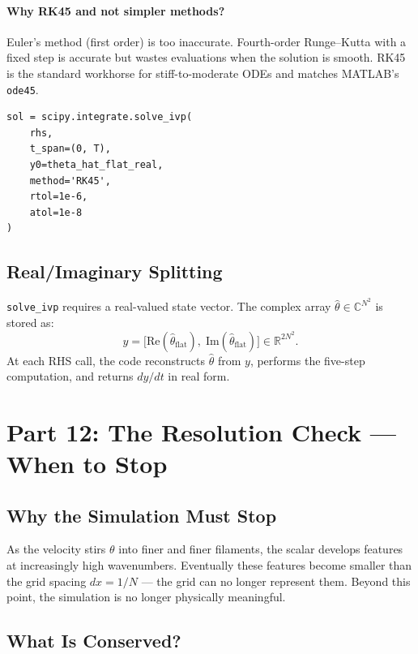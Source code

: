 \documentclass[12pt,a4paper]{article}
\newcommand{\code}[1]{\texttt{#1}}
\theoremstyle{definition}
\begin{document}
\paragraph{Why RK45 and not simpler methods?}
Euler's method (first order) is too inaccurate.  Fourth-order Runge--Kutta
with a fixed step is accurate but wastes evaluations when the solution is
smooth.  RK45 is the standard workhorse for stiff-to-moderate ODEs and matches
MATLAB's \code{ode45}.

\begin{lstlisting}
sol = scipy.integrate.solve_ivp(
    rhs,
    t_span=(0, T),
    y0=theta_hat_flat_real,
    method='RK45',
    rtol=1e-6,
    atol=1e-8
)
\end{lstlisting}

\subsection{Real/Imaginary Splitting}

\code{solve\_ivp} requires a real-valued state vector.  The complex array
$\hat\theta\in\mathbb{C}^{N^2}$ is stored as:
\[
  y = \bigl[\mathrm{Re}(\hat\theta_{\mathrm{flat}}),\;
            \mathrm{Im}(\hat\theta_{\mathrm{flat}})\bigr]
    \in \mathbb{R}^{2N^2}.
\]
At each RHS call, the code reconstructs $\hat\theta$ from $y$, performs the
five-step computation, and returns $dy/dt$ in real form.

\section{Part 12: The Resolution Check — When to Stop}

\subsection{Why the Simulation Must Stop}

As the velocity stirs $\theta$ into finer and finer filaments, the scalar
develops features at increasingly high wavenumbers.  Eventually these features
become smaller than the grid spacing $dx = 1/N$ — the grid can no longer
represent them.  Beyond this point, the simulation is no longer physically
meaningful.

\subsection{What Is Conserved?}
\end{document}
